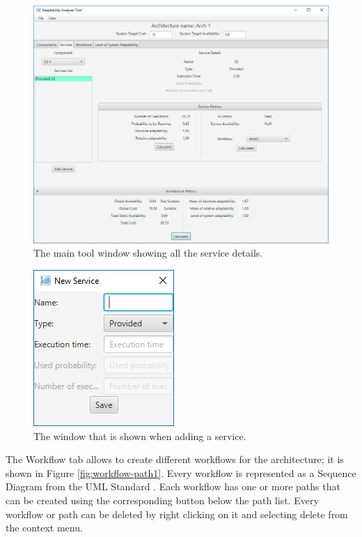 \begin{figure}[!ht]
	\centerline
	{\includegraphics[scale=0.50]{img/serv_details.png}}
	\caption[Service Details Tab]{The main tool window showing all the service details.}
	\label{fig:serv-details}
\end{figure}

\begin{figure}[!ht]
	\centerline
	{\includegraphics[scale=0.6]{img/add_serv.png}}
	\caption[Add Service Window]{The window that is shown when adding a service.}
	\label{fig:add-serv}
\end{figure}

The Workflow tab allows to create different workflows for the architecture; it is shown in Figure \ref{fig:workflow-path1}. Every workflow is represented as a Sequence Diagram from the UML Standard \cite{uml}. Each workflow has one or more paths that can be created using the corresponding button below the path list. Every workflow or path can be deleted by right clicking on it and selecting delete from the context menu. 


